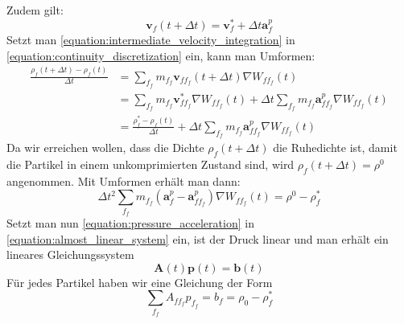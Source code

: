 \documentclass[11pt,
a4paper,
parskip=half, %
BCOR=10mm, %
english,
ngerman]{scrreprt}
\begin{document}
Zudem gilt:
\begin{equation}
    \label{equation:intermediate_velocity_integration}
    \textbf{v}_f(t + \Delta t) = \textbf{v}_f^* + \Delta t \textbf{a}_f^p
\end{equation}
Setzt man \eqref{equation:intermediate_velocity_integration} in \eqref{equation:continuity_discretization} ein, kann man Umformen:
\begin{align}
    \frac{\rho_f(t+\Delta t) - \rho_f(t)}{\Delta t} &= \sum_{f_f} m_{f_f} \textbf{v}_{ff_f}(t+\Delta t) \nabla W_{ff_f}(t) \\
        &= \sum_{f_f} m_{f_f} \textbf{v}_{ff_f}^* \nabla W_{ff_f}(t) + \Delta t \sum_{f_f} m_{f_f} \textbf{a}_{ff_f}^p \nabla W_{ff_f}(t) \\
        &= \frac{\rho_f^* - \rho_f(t)}{\Delta t} + \Delta t \sum_{f_f} m_{f_f} \textbf{a}_{ff_f}^p \nabla W_{ff_f}(t)
\end{align}
Da wir erreichen wollen, dass die Dichte $\rho_f(t+\Delta t)$ die Ruhedichte ist, damit die Partikel in einem unkomprimierten Zustand sind,
wird $\rho_f(t+\Delta t) = \rho^0$ angenommen.
Mit Umformen erhält man dann:
\begin{equation}
    \label{equation:almost_linear_system}
    \Delta t^2 \sum_{f_f} m_{f_f} \left(\textbf{a}_f^p - \textbf{a}_{ff_f}^p\right) \nabla W_{ff_f}(t) = \rho^0 - \rho_f^*
\end{equation}
Setzt man nun \eqref{equation:pressure_acceleration} in \eqref{equation:almost_linear_system} ein, ist der Druck linear und man erhält ein lineares Gleichungssystem
\begin{equation}
    \textbf{A}(t) \textbf{p}(t) = \textbf{b}(t)
\end{equation}
Für jedes Partikel haben wir eine Gleichung der Form
\begin{equation}
    \sum_{f_f} A_{ff_f} p_{f_f} = b_f = \rho_0 - \rho_f^*
\end{equation}
\end{document}
